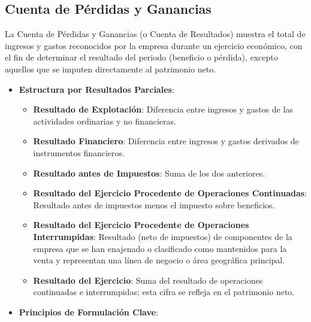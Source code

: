 \documentclass[
  paper=a4,
  ,captions=tableheading
]{scrbook}
\providecommand{\tightlist}{%
  \setlength{\itemsep}{0pt}\setlength{\parskip}{0pt}}
\begin{document}
\hypertarget{cuenta-de-puxe9rdidas-y-ganancias}{%
\subsection{Cuenta de Pérdidas y
Ganancias}\label{cuenta-de-puxe9rdidas-y-ganancias}}

La Cuenta de Pérdidas y Ganancias (o Cuenta de Resultados) muestra el
total de ingresos y gastos reconocidos por la empresa durante un
ejercicio económico, con el fin de determinar el resultado del periodo
(beneficio o pérdida), excepto aquellos que se imputen directamente al
patrimonio neto.

\begin{itemize}
\tightlist
\item
  \textbf{Estructura por Resultados Parciales}:

  \begin{itemize}
  \tightlist
  \item
    \textbf{Resultado de Explotación}: Diferencia entre ingresos y
    gastos de las actividades ordinarias y no financieras.
  \item
    \textbf{Resultado Financiero}: Diferencia entre ingresos y gastos
    derivados de instrumentos financieros.
  \item
    \textbf{Resultado antes de Impuestos}: Suma de los dos anteriores.
  \item
    \textbf{Resultado del Ejercicio Procedente de Operaciones
    Continuadas}: Resultado antes de impuestos menos el impuesto sobre
    beneficios.
  \item
    \textbf{Resultado del Ejercicio Procedente de Operaciones
    Interrumpidas}: Resultado (neto de impuestos) de componentes de la
    empresa que se han enajenado o clasificado como mantenidos para la
    venta y representan una línea de negocio o área geográfica
    principal.
  \item
    \textbf{Resultado del Ejercicio}: Suma del resultado de operaciones
    continuadas e interrumpidas; esta cifra se refleja en el patrimonio
    neto.
  \end{itemize}
\item
  \textbf{Principios de Formulación Clave}:


\end{itemize}
\end{document}
